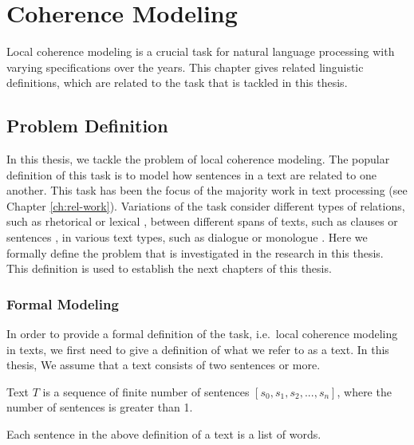
\chapter{Coherence Modeling}
\label{ch:coherence}

Local coherence modeling is a crucial task for natural language processing with varying specifications over the years. 
This chapter gives related linguistic definitions, which are related to the task that is tackled in this thesis. 


\section{Problem Definition}
\label{sec:coh-def}

In this thesis, we tackle the problem of local coherence modeling. 
The popular definition of this task is to model how sentences in a text are related to one another. 
This task has been the focus of the majority work in text processing (see Chapter \ref{ch:rel-work}). 
Variations of the task consider different types of relations, such as rhetorical \cite{hovyeduard89} or lexical \cite{morris91}, between different spans of texts, such as clauses \cite{strube.col98} or sentences \cite{halliday76}, in various text types, such as dialogue \cite{wangxinhao13} or monologue \cite{barzilay08}. 
Here we formally define the problem that is investigated in the research in this thesis.  
This definition is used to establish the next chapters of this thesis. 

\subsection{Formal Modeling}

In order to provide a formal definition of the task, i.e.\ local coherence modeling in texts, we first need to give a definition of what we refer to as a text. 
In this thesis, 
We assume that a text consists of two sentences or more.  

\begin{definition}
Text $T$ is a sequence of finite number of sentences $[s_0, s_1, s_2, ..., s_n]$, where the number of sentences is greater than 1.   
\end{definition}

Each sentence in the above definition of a text is a list of words.

